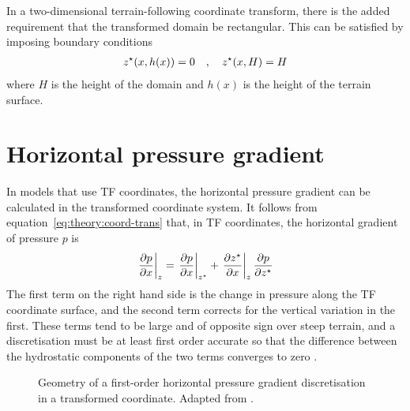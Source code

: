 In a two-dimensional terrain-following coordinate transform, there is the added requirement that the transformed domain be rectangular.  This can be satisfied by imposing boundary conditions \autocite{schaer2002}
\begin{align}
	{z^\star}(x, h(x)) = 0 \quad,\quad {z^\star}(x, H) = H
\end{align}
where $H$ is the height of the domain and $h(x)$ is the height of the terrain surface.

\section{Horizontal pressure gradient}
In models that use TF coordinates, the horizontal pressure gradient can be calculated in the transformed coordinate system.  It follows from equation~\ref{eq:theory:coord-trans} that, in TF coordinates, the horizontal gradient of pressure $p$ is \autocite{mahrer1984}
\begin{align}
	\left. \frac{\partial p}{\partial x} \right|_z = 
	\left. \frac{\partial p}{\partial x} \right|_{z^\star} + 
	\left. \frac{\partial {z^\star}}{\partial x} \right|_z
	\frac{\partial p}{\partial {z^\star}} \label{eqn:theory:pressure-transform}
\end{align}
The first term on the right hand side is the change in pressure along the TF coordinate surface, and the second term corrects for the vertical variation in the first.  These terms tend to be large and of opposite sign over steep terrain, and a discretisation must be at least first order accurate so that the difference between the hydrostatic components of the two terms converges to zero \autocite{gary1973}.

\begin{figure}
	\centering
	
	\caption{Geometry of a first-order horizontal pressure gradient discretisation in a transformed coordinate.  Adapted from \textcite{mahrer1984}.}
	\label{fig:theory:pressure-error}
\end{figure}

